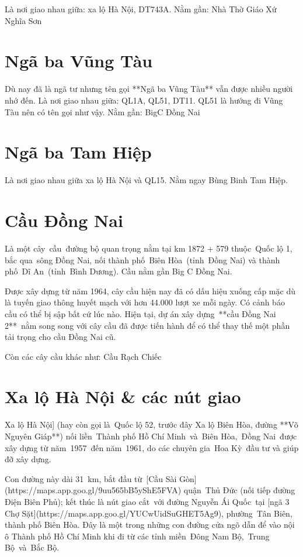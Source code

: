 Là nơi giao nhau giữa: xa lộ Hà Nội, DT743A. Nằm gần: Nhà Thờ Giáo Xứ Nghĩa Sơn

\section{Ngã ba Vũng Tàu}

Dù nay đã là ngã tư nhưng tên gọi **Ngã ba Vũng Tàu** vẫn được nhiều người nhớ đến. Là nơi giao nhau giữa: QL1A, QL51, DT11. QL51 là hướng đi Vũng Tàu nên có tên gọi như vậy. Nằm gần: BigC Đồng Nai

\section{Ngã ba Tam Hiệp}

Là nơi giao nhau giữa xa lộ Hà Nội và QL15. Nằm ngay Bùng Binh Tam Hiệp.

\section{Cầu Đồng Nai}

Là một cây cầu đường bộ quan trọng nằm tại km 1872 + 579 thuộc Quốc lộ 1, bắc qua sông Đồng Nai, nối thành phố Biên Hòa (tỉnh Đồng Nai) và thành phố Dĩ An (tỉnh Bình Dương). Cầu nằm gần Big C Đồng Nai.

Được xây dựng từ năm 1964, cây cầu hiện nay đã có dấu hiệu xuống cấp mặc dù là tuyến giao thông huyết mạch với hơn 44.000 lượt xe mỗi ngày. Có cảnh báo cầu có thể bị sập bất cứ lúc nào. Hiện tại, dự án xây dựng **cầu Đồng Nai 2** nằm song song với cây cầu đã được tiến hành để có thể thay thế một phần tải trọng cho cầu Đồng Nai cũ.

Còn các cây cầu khác như: Cầu Rạch Chiếc

\section{Xa lộ Hà Nội \& các nút giao}

Xa lộ Hà Nội] (hay còn gọi là Quốc lộ 52, trước đây Xa lộ Biên Hòa, đường **Võ Nguyên Giáp**) nối liền Thành phố Hồ Chí Minh và Biên Hòa, Đồng Nai được xây dựng từ năm 1957 đến năm 1961, do các chuyên gia Hoa Kỳ đầu tư và giúp đỡ xây dựng.

Con đường này dài 31 km, bắt đầu từ [Cầu Sài Gòn](https://maps.app.goo.gl/9uu565bB5yShE5FVA) quận Thủ Đức (nối tiếp đường Điện Biên Phủ); kết thúc là nút giao cắt với đường Nguyễn Ái Quốc tại [ngã 3 Chợ Sặt](https://maps.app.goo.gl/YUCwUidSuGHET5Ag9), phường Tân Biên, thành phố Biên Hòa. Đây là một trong những con đường cửa ngõ dẫn để vào nội ô Thành phố Hồ Chí Minh khi đi từ các tỉnh miền Đông Nam Bộ, Trung Bộ và Bắc Bộ.

